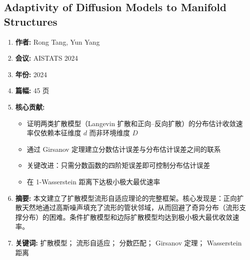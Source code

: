 \subsection{Adaptivity of Diffusion Models to Manifold Structures}
\begin{enumerate}
    \item \textbf{作者:} Rong Tang, Yun Yang
    \item \textbf{会议:} AISTATS 2024
    \item \textbf{年份:} 2024
    \item \textbf{篇幅:} 45 页
    \item \textbf{核心贡献:}
        \begin{itemize}
            \item 证明两类扩散模型（Langevin 扩散和正向--反向扩散）的分布估计收敛速率仅依赖本征维度 $d$ 而非环境维度 $D$
            \item 通过 Girsanov 定理建立分数估计误差与分布估计误差之间的联系
            \item 关键改进：只需分数函数的四阶矩误差即可控制分布估计误差
            \item 在 1-Wasserstein 距离下达极小极大最优速率
        \end{itemize}
    \item \textbf{摘要:} 本文建立了扩散模型流形自适应理论的完整框架。核心发现是：正向扩散天然地通过高斯噪声填充了流形的管状邻域，从而回避了奇异分布（流形支撑分布）的困难。条件扩散模型和边际扩散模型均达到极小极大最优收敛速率。
    \item \textbf{关键词:} 扩散模型； 流形自适应； 分数匹配； Girsanov 定理； Wasserstein 距离
\end{enumerate}

